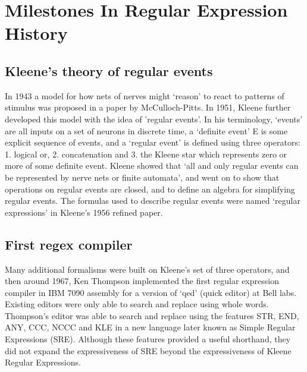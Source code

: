 \section{Milestones In Regular Expression History}

\subsection{Kleene's theory of regular events}
In 1943 a model for how nets of nerves might `reason' to react to patterns of stimulus was proposed in a paper by McCulloch-Pitts.  In 1951, Kleene further developed this model with the idea of 'regular events'.  In his terminology, `events' are all inputs on a set of neurons in discrete time, a `definite event' E is some explicit sequence of events, and a `regular event' is defined using three operators: 1. logical or, 2. concatenation and 3. the Kleene star which represents zero or more of some definite event.  Kleene showed that `all and only regular events can be represented by nerve nets or finite automata', and went on to show that operations on regular events are closed, and to define an algebra for simplifying regular events.  The formulas used to describe regular events were named `regular expressions' in Kleene's 1956 refined paper.

\subsection{First regex compiler}
Many additional formalisms were built on Kleene's set of three operators, and then around 1967, Ken Thompson implemented the first regular expression compiler in IBM 7090 assembly for a version of `qed' (quick editor) at Bell labs.  Existing editors were only able to search and replace using whole words.  Thompson's editor was able to search and replace using the features STR, END, ANY, CCC, NCCC and KLE in a new language later known as Simple Regular Expressions (SRE).  Although these features provided a useful shorthand, they did not expand the expressiveness of SRE beyond the expressiveness of Kleene Regular Expressions.

